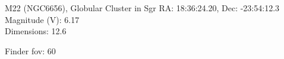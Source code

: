\begin{block}{M22 (NGC6656), Globular Cluster in Sgr}
    RA: 18:36:24.20, Dec: -23:54:12.3 \\ 
    Magnitude (V): 6.17 \\ 
    Dimensions: 12.6 

    Finder fov: 60 
\end{block}